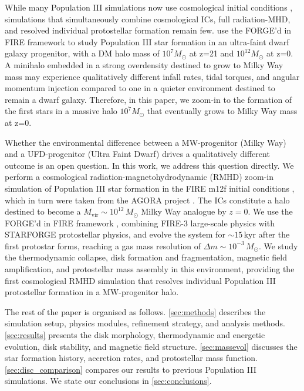 \documentclass[twocolumn]{openjournal}
\newcommand{\Msun}{M_\odot}
\newcommand{\kyr}{\,\mathrm{kyr}}
\begin{document}
While many Population III simulations now use cosmological initial conditions
\citep{greif11, stacy16, hirano_sakai23, latif_khochfar22, meziani26},
simulations that simultaneously combine cosmological ICs,
full radiation-MHD, and resolved individual protostellar formation remain
few. \cite{meziani26} use the FORGE'd in FIRE framework \citep{FORGE_d_in_FIRE_Hopkin_2023} to study Population III star formation in an ultra-faint dwarf galaxy progenitor, with a DM halo mass of $10^{7} M_\odot$  at z=21 and $10^{12} M_\odot$ at z=0. A minihalo embedded in a strong overdensity destined to grow to Milky Way mass may experience qualitatively different infall rates, tidal torques, and angular momentum injection compared to one in a quieter
environment destined to remain a dwarf galaxy. Therefore, in this paper, we zoom-in to the formation of the first stars in a massive halo $10^{7} M_\odot$ that eventually grows to Milky Way mass at z=0.

Whether the environmental difference between a MW-progenitor (Milky Way) and a
UFD-progenitor (Ultra Faint Dwarf) drives a qualitatively different outcome is an open question.
In this work, we address this question directly.
We perform a cosmological radiation-magnetohydrodynamic (RMHD) zoom-in
simulation of Population III star formation in the FIRE m12f initial conditions
\citep{FIRE_2, wetzel23}, which in turn were taken from the AGORA project
\citep{AGORA2014, AGORA2016}. The ICs constitute a halo destined to become a
$M_\mathrm{vir} \sim 10^{12}\,\Msun$ Milky Way analogue by $z = 0$.
We use the FORGE'd in FIRE framework \citep{FORGE_d_in_FIRE_Hopkin_2023,
	meziani26}, combining FIRE-3 \citep{FIRE_3_Updated_Hopkin} large-scale
physics with STARFORGE \citep{STARFORGE_Towa_Grudic_2021} protostellar
physics, and evolve the system for $\sim 15\kyr$ after the first
protostar forms, reaching a gas mass resolution of
$\Delta m \sim 10^{-3}\,\Msun$.
We study the thermodynamic collapse, disk formation and fragmentation,
magnetic field amplification, and protostellar mass assembly in this
environment, providing the first cosmological RMHD simulation that
resolves individual Population III protostellar formation in a MW-progenitor halo.

The rest of the paper is organised as follows.
\autoref{sec:methods} describes the simulation setup, physics
modules, refinement strategy, and analysis methods.
\autoref{sec:results} presents the disk morphology, thermodynamic
and energetic evolution, disk stability, and magnetic field structure.
\autoref{sec:massevol} discusses the star formation history,
accretion rates, and protostellar mass function.
\autoref{sec:disc_comparison} compares our results to previous
Population III simulations.
We state our conclusions in \autoref{sec:conclusions}.
\end{document}
